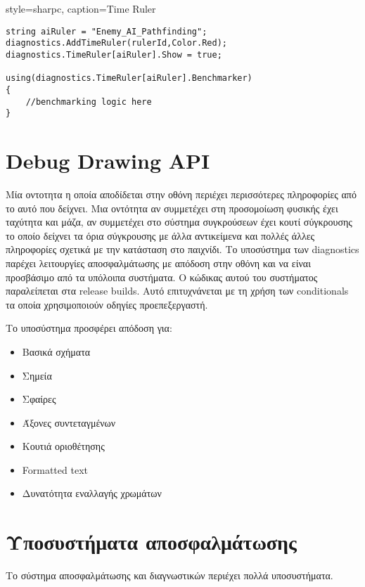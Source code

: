\lstset
{
	style=sharpc, 
	caption={Time Ruler}
}
\begin{lstlisting}
string aiRuler = "Enemy_AI_Pathfinding";
diagnostics.AddTimeRuler(rulerId,Color.Red);
diagnostics.TimeRuler[aiRuler].Show = true;

using(diagnostics.TimeRuler[aiRuler].Benchmarker)
{
	//benchmarking logic here
}
\end{lstlisting}

\section{Debug Drawing API}
Μία οντοτητα η οποία αποδίδεται στην οθόνη περιέχει περισσότερες πληροφορίες από το αυτό που δείχνει. Μια οντότητα αν συμμετέχει στη προσομοίωση φυσικής έχει ταχύτητα και μάζα, αν συμμετέχει στο σύστημα συγκρούσεων έχει κουτί σύγκρουσης το οποίο δείχνει τα όρια σύγκρουσης με άλλα αντικείμενα και πολλές άλλες πληροφορίες σχετικά με την κατάσταση στο παιχνίδι.
Το υποσύστημα των diagnostics παρέχει λειτουργίες αποσφαλμάτωσης με απόδοση στην οθόνη και να είναι προσβάσιμο από τα υπόλοιπα συστήματα. Ο κώδικας αυτού του συστήματος παραλείπεται στα release builds. Αυτό επιτυχνάνεται με τη χρήση των conditionals τα οποία χρησιμοποιούν οδηγίες προεπεξεργαστή.

Το υποσύστημα προσφέρει απόδοση για:
\begin{itemize}
	\item Βασικά σχήματα
	\item Σημεία
	\item Σφαίρες
	\item Άξονες συντεταγμένων
	\item Κουτιά οριοθέτησης
	\item Formatted text
	\item Δυνατότητα εναλλαγής χρωμάτων
\end{itemize}

\section{Υποσυστήματα αποσφαλμάτωσης}
Το σύστημα αποσφαλμάτωσης και διαγνωστικών περιέχει πολλά υποσυστήματα.


